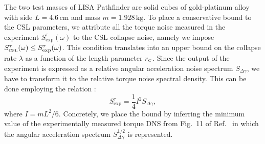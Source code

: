 \documentclass[aps,twocolumn,pra,superscriptaddress]{revtex4-2}
\newcommand\rC{r_\text{\tiny C}}
\begin{document}
The two test masses of LISA Pathfinder are solid cubes of gold-platinum alloy with side $L=4.6\, \mathrm{cm}$ and mass $m=1.928\, \mathrm{kg}$.
To place a conservative bound to the CSL parameters, we attribute all the torque noise measured in the experiment {$S^\tau_{\text{exp}}(\omega)$} to the CSL collapse noise, {namely we impose $S^\tau_{\text{\tiny{CSL}}}(\omega)\le S^\tau_{\text{exp}}(\omega)$}.
{This condition translates into an upper bound on the collapse rate $\lambda$ as a function of the length parameter $\rC$.}
Since the output of the experiment is expressed as a relative angular acceleration noise spectrum $S_{\Delta \gamma}$, we have to transform it to the relative torque noise
spectral density. This can be done employing the relation  \cite{carlesso2016experimental}:
\begin{equation}
S^\tau_{\text{exp}}=\frac{1}{4}I^2 S_{\Delta \gamma} ,
\end{equation}
where $I=mL^2/6$.
Concretely, we place the bound by inferring the {minimum} value of the experimentally measured torque DNS {from Fig.~11 of Ref.~\cite{armano2024nano} in which the angular acceleration spectrum $S_{\Delta \gamma}^{1/2}$ is represented.}  
\end{document}
